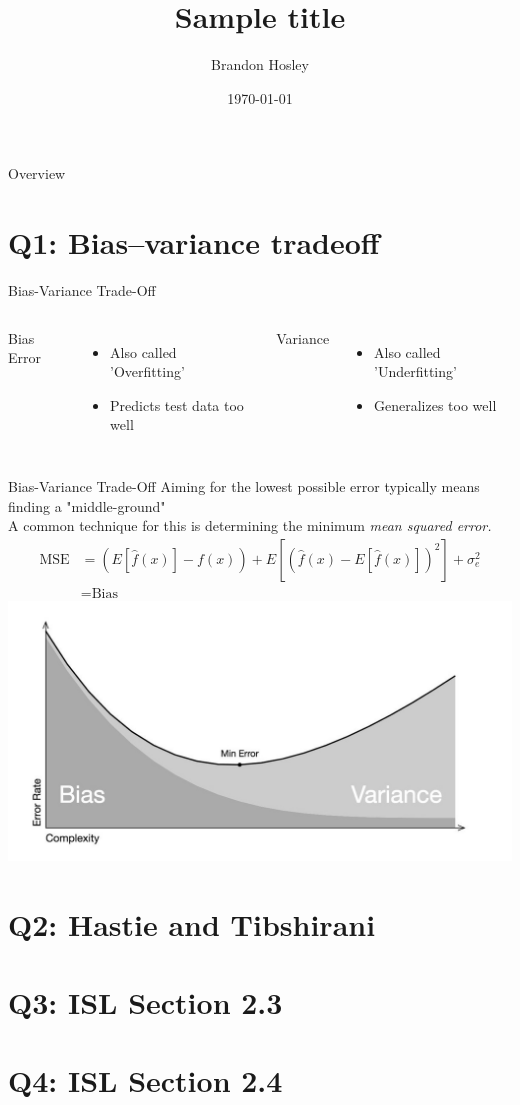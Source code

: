 \documentclass{beamer}
\title{Sample title}
\author{Brandon Hosley}
\institute{University of Illinois - Springfield}
\date{\today}
\begin{document}
\frame{\titlepage}

\begin{frame}{Overview}
\tableofcontents
\end{frame}

\section[Q1]{Q1: Bias–variance tradeoff}

\begin{frame}{Bias-Variance Trade-Off}
	\begin{columns}
		Bias Error
		\begin{itemize}
			\item<1-> Also called 'Overfitting'
			\item<4-> Predicts test data too well
		\end{itemize}
		
		Variance 
		\begin{itemize}
			\item<2-> Also called 'Underfitting'
			\item<5-> Generalizes too well
		\end{itemize}
	\end{columns}
	\centering
\end{frame}

\begin{frame}{Bias-Variance Trade-Off}
	Aiming for the lowest possible error typically means finding a "middle-ground" \\
	A common technique for this is determining the minimum \emph{mean squared error.} \\
	\begin{align}
		\text{MSE} &= \left( E\left[\hat{f}(x)\right]-f(x)\right) + E\left[\left(\hat{f}(x) - E\left[\hat{f}(x)\right]\right)^2\right] +
		\sigma^2_e \\
		&= \text{Bias}
	\end{align}
	\includegraphics[width=0.5\linewidth]{MinError}
\end{frame}

\section[Q2]{Q2: Hastie and Tibshirani}
\section[Q3]{Q3: ISL Section 2.3}
\section[Q4]{Q4: ISL Section 2.4}
\end{document}
